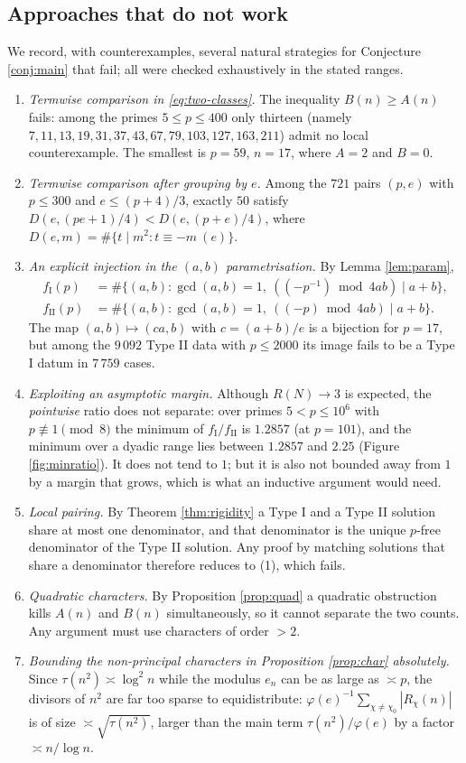 \documentclass[11pt,reqno]{amsart}
\theoremstyle{plain}
\theoremstyle{definition}
\numberwithin{equation}{section}
\newcommand{\fI}{f_{\mathrm{I}}}
\newcommand{\fII}{f_{\mathrm{II}}}
\begin{document}
\subsection{Approaches that do not work}\label{sec:fail}
We record, with counterexamples, several natural strategies for Conjecture
\ref{conj:main} that fail; all were checked exhaustively in the stated ranges.

\begin{enumerate}
\item \emph{Termwise comparison in \eqref{eq:two-classes}.} The inequality
$B(n)\ge A(n)$ fails: among the primes $5\le p\le400$ only thirteen (namely
$7,11,13,19,31,37,43,67,79,103,127,163,211$) admit no local counterexample. The
smallest is $p=59$, $n=17$, where $A=2$ and $B=0$.
\item \emph{Termwise comparison after grouping by $e$.} Among the $721$ pairs $(p,e)$
with $p\le300$ and $e\le(p+4)/3$, exactly $50$ satisfy
$D(e,(pe+1)/4)<D(e,(p+e)/4)$, where $D(e,m)=\#\{t\mid m^{2}: t\equiv-m\ (e)\}$.
\item \emph{An explicit injection in the $(a,b)$ parametrisation.} By Lemma
\ref{lem:param},
\begin{align*}
  \fI(p)&=\#\{(a,b):\gcd(a,b)=1,\ ((-p^{-1})\bmod 4ab)\mid a+b\},\\
  \fII(p)&=\#\{(a,b):\gcd(a,b)=1,\ ((-p)\bmod 4ab)\mid a+b\}.
\end{align*}
The map
$(a,b)\mapsto(ca,b)$ with $c=(a+b)/e$ is a bijection for $p=17$, but among the $9\,092$
Type II data with $p\le2000$ its image fails to be a Type I datum in $7\,759$ cases.
\item \emph{Exploiting an asymptotic margin.} Although $R(N)\to3$ is expected, the
\emph{pointwise} ratio does not separate: over primes $5<p\le10^{6}$ with
$p\not\equiv1\pmod 8$ the minimum of $\fI/\fII$ is $1.2857$ (at $p=101$), and the
minimum over a dyadic range lies between $1.2857$ and $2.25$
(Figure \ref{fig:minratio}). It does not tend to $1$; but it is also not bounded away
from $1$ by a margin that grows, which is what an inductive argument would need.
\item \emph{Local pairing.} By Theorem \ref{thm:rigidity} a Type I and a Type II
solution share at most one denominator, and that denominator is the unique
$p$-free denominator of the Type II solution. Any proof by matching solutions that
share a denominator therefore reduces to (1), which fails.
\item \emph{Quadratic characters.} By Proposition \ref{prop:quad} a quadratic
obstruction kills $A(n)$ and $B(n)$ simultaneously, so it cannot separate the two
counts. Any argument must use characters of order $>2$.
\item \emph{Bounding the non-principal characters in Proposition \ref{prop:char}
absolutely.} Since $\tau(n^{2})\asymp\log^{2}n$ while the modulus $e_{n}$ can be as
large as $\asymp p$, the divisors of $n^{2}$ are far too sparse to equidistribute:
$\varphi(e)^{-1}\sum_{\chi\ne\chi_{0}}|R_{\chi}(n)|$ is of size $\asymp\sqrt{\tau(n^{2})}$,
larger than the main term $\tau(n^{2})/\varphi(e)$ by a factor $\asymp n/\log n$.
\end{enumerate}
\end{document}

